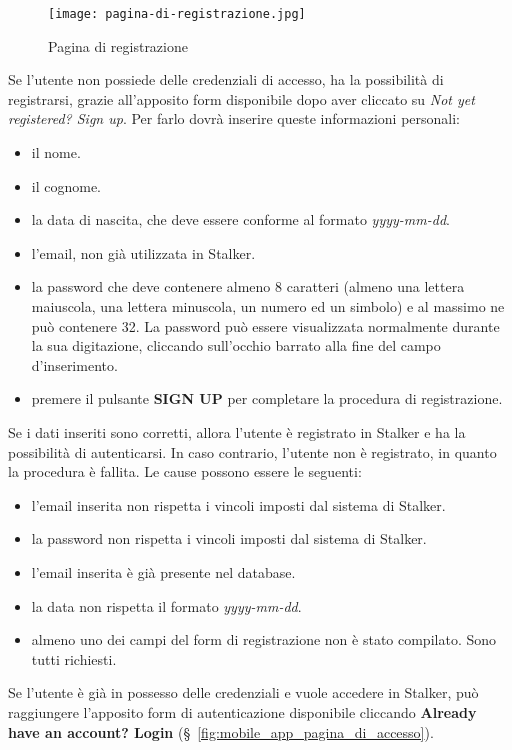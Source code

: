 \documentclass[../manuale-utente.tex]{subfiles}
\begin{document}
\begin{figure}[H]
    \centering
    \texttt{[image: pagina-di-registrazione.jpg]}
    \caption{Pagina di registrazione}%
    \label{fig:mobile_app_pagina_di_registrazione}
\end{figure}
Se l'utente non possiede delle credenziali di accesso, ha la possibilità di registrarsi, grazie all'apposito form disponibile dopo aver cliccato su \textit{Not yet registered? Sign up}. Per farlo dovrà inserire queste informazioni personali:
\begin{itemize}
    \item il nome.
    \item il cognome.
    \item la data di nascita, che deve essere conforme al formato \textit{yyyy-mm-dd}.
    \item l'email, non già utilizzata in Stalker.
    \item la password che deve contenere almeno 8 caratteri (almeno una lettera maiuscola, una lettera minuscola, un numero ed un simbolo) e al massimo ne può contenere 32. La password può essere visualizzata normalmente durante la sua digitazione, cliccando sull'occhio barrato alla fine del campo d'inserimento.
    \item premere il pulsante \textbf{SIGN UP} per completare la procedura di registrazione.
\end{itemize}
Se i dati inseriti sono corretti, allora l'utente è registrato in Stalker e ha la possibilità di autenticarsi.
In caso contrario, l'utente non è registrato, in quanto la procedura è fallita.
Le cause possono essere le seguenti:
\begin{itemize}
    \item l'email inserita non rispetta i vincoli imposti dal sistema di Stalker.
    \item la password non rispetta i vincoli imposti dal sistema di Stalker.
    \item l'email inserita è già presente nel database.
    \item la data non rispetta il formato \textit{yyyy-mm-dd}.
    \item almeno uno dei campi del form di registrazione non è stato compilato. Sono tutti richiesti.
\end{itemize}
Se l'utente è già in possesso delle credenziali e vuole accedere in Stalker, può raggiungere l'apposito form di autenticazione disponibile cliccando \textbf{Already have an account? Login} (§~\ref{fig:mobile_app_pagina_di_accesso}).
\end{document}
